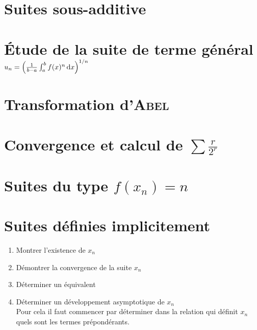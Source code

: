 \section{Suites sous-additive}


\section{Étude de la suite de terme général \texorpdfstring{$u_n = \left( \frac{1}{b-a} \int_{a}^{b} f(x)^n \, \mathrm{d} x \right)^{1/n}$}{égal à une intégrale}}


\section{Transformation d'\textsc{Abel}} \label{transformation_abel}


\section{Convergence et calcul de  \texorpdfstring{$\sum \frac{r}{2^r}$}{de la série de terme général r/2^r}}


\section{Suites du type \texorpdfstring{$f(x_n) = n$}{f(x_n) = n}}


\section{Suites définies implicitement}

\begin{methode}
    \begin{enumerate}
        \item Montrer l'existence de $x_n$
        \item Démontrer la convergence de la suite $x_n$
        \item Déterminer un équivalent 
        \item Déterminer un développement asymptotique de $x_n$ \\
        Pour cela il faut commencer par déterminer dans la relation qui définit $x_n$ quels sont les termes prépondérants. 
    \end{enumerate}
\end{methode}

